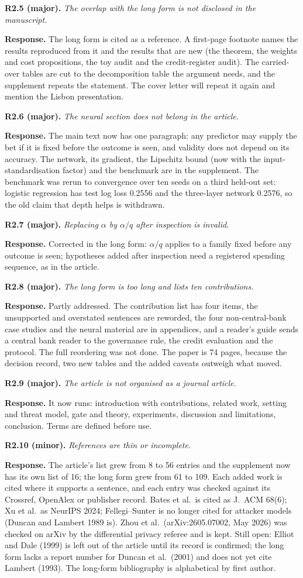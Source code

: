 \documentclass[11pt,a4paper]{article}
\newcommand{\point}[2]{\par\medskip\textbf{#1} \emph{#2}\par}
\newcommand{\reply}{\textbf{Response.} }
\begin{document}
\point{R2.5 (major).}{The overlap with the long form is not disclosed in the
manuscript.}
\reply The long form is cited as a reference. A first-page footnote names the results
reproduced from it and the results that are new (the theorem, the weights and cost
propositions, the toy audit and the credit-register audit). The carried-over tables are
cut to the decomposition table the argument needs, and the supplement repeats the
statement. The cover letter will repeat it again and mention the Lisbon presentation.

\point{R2.6 (major).}{The neural section does not belong in the article.}
\reply The main text now has one paragraph: any predictor may supply the bet if it is
fixed before the outcome is seen, and validity does not depend on its accuracy. The
network, its gradient, the Lipschitz bound (now with the input-standardisation factor)
and the benchmark are in the supplement. The benchmark was rerun to convergence over ten
seeds on a third held-out set: logistic regression has test log loss 0.2556 and the
three-layer network 0.2576, so the old claim that depth helps is withdrawn.

\point{R2.7 (major).}{Replacing $\alpha$ by $\alpha/q$ after inspection is invalid.}
\reply Corrected in the long form: $\alpha/q$ applies to a family fixed before any
outcome is seen; hypotheses added after inspection need a registered spending sequence,
as in the article.

\point{R2.8 (major).}{The long form is too long and lists ten contributions.}
\reply Partly addressed. The contribution list has four items, the unsupported and
overstated sentences are reworded, the four non-central-bank case studies and the neural
material are in appendices, and a reader's guide sends a central bank reader to the
governance rule, the credit evaluation and the protocol. The full reordering was not
done. The paper is 74 pages, because the decision record, two new tables and the added
caveats outweigh what moved.

\point{R2.9 (major).}{The article is not organised as a journal article.}
\reply It now runs: introduction with contributions, related work, setting and threat
model, gate and theory, experiments, discussion and limitations, conclusion. Terms are
defined before use.

\point{R2.10 (minor).}{References are thin or incomplete.}
\reply The article's list grew from 8 to 56 entries and the supplement now has its own list of 16; the long form grew from 61 to 109. Each added work is cited where it supports a sentence, and each entry was checked against its Crossref, OpenAlex or publisher record. Bates et al.\ is cited as
J.\ ACM 68(6); Xu et al.\ as NeurIPS 2024; Fellegi--Sunter is no longer cited for
attacker models (Duncan and Lambert 1989 is). Zhou et al.\ (arXiv:2605.07002, May 2026)
was checked on arXiv by the differential privacy referee and is kept. Still open:
Elliot and Dale (1999) is left out of the article until its record is confirmed; the
long form lacks a report number for Duncan et al.\ (2001) and does not yet cite Lambert
(1993). The long-form bibliography is alphabetical by first author.
\end{document}

